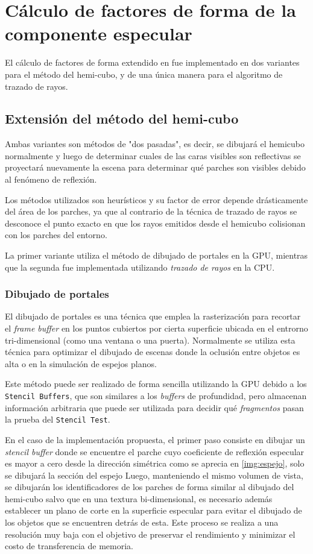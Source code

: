 \section{Cálculo de factores de forma de la componente especular}

El cálculo de factores de forma extendido en fue implementado en dos variantes para el método del hemi-cubo, y de una única manera para el algoritmo de trazado de rayos.

\subsection{Extensión del método del hemi-cubo}
Ambas variantes son métodos de "dos pasadas", es decir, se dibujará el hemicubo normalmente y luego de determinar cuales de las caras visibles son reflectivas se proyectará nuevamente la escena para determinar qué parches son visibles debido al fenómeno de reflexión.

Los métodos utilizados son heurísticos y su factor de error depende drásticamente del área de los parches, ya que al contrario de la técnica de trazado de rayos se desconoce el punto exacto en que los rayos emitidos desde el hemicubo colisionan con los parches del entorno.

La primer variante utiliza el método de dibujado de portales en la GPU, mientras que la segunda fue implementada utilizando \textit{trazado de rayos} en la CPU.

\subsubsection{Dibujado de portales}

El dibujado de portales es una técnica que emplea la rasterización para recortar el \textit{frame buffer} en los puntos cubiertos por cierta superficie ubicada en el entrorno tri-dimensional (como una ventana o una puerta). Normalmente se utiliza esta técnica para optimizar el dibujado de escenas donde la oclusión entre objetos es alta o en la simulación de espejos planos.

Este método puede ser realizado de forma sencilla utilizando la GPU debido a los \verb|Stencil Buffers|, que son similares a los \textit{buffers} de profundidad, pero almacenan información arbitraria que puede ser utilizada para decidir qué \textit{fragmentos} pasan la prueba del \verb|Stencil Test|.

En el caso de la implementación propuesta, el primer paso consiste en dibujar un \textit{stencil buffer} donde se encuentre el parche cuyo coeficiente de reflexión especular es mayor a cero desde la dirección simétrica como se aprecia en \ref{img:espejo}, solo se dibujará la sección del espejo  Luego, manteniendo el mismo volumen de vista, se dibujarán los identificadores de los parches de forma similar al dibujado del hemi-cubo salvo que en una textura bi-dimensional, es necesario además establecer un plano de corte en la superficie especular para evitar el dibujado de los objetos que se encuentren detrás de esta. Este proceso se realiza a una resolución muy baja con el objetivo de preservar el rendimiento y minimizar el costo de transferencia de memoria.

